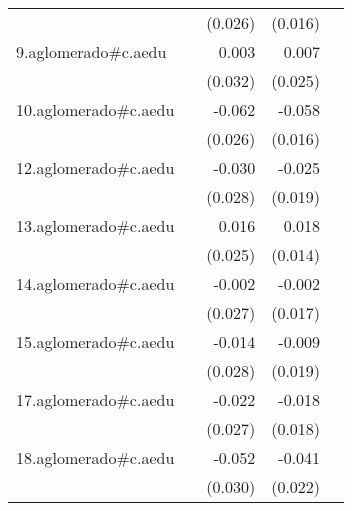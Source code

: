 {\begin{longtable}{l*{4}{D{.}{.}{-1}}}
            &                     &     (0.026)         &     (0.016)         &                     \\
\addlinespace
9.aglomerado#c.aedu&                     &       0.003         &       0.007         &                     \\
            &                     &     (0.032)         &     (0.025)         &                     \\
\addlinespace
10.aglomerado#c.aedu&                     &      -0.062\sym{*}  &      -0.058\sym{***}&                     \\
            &                     &     (0.026)         &     (0.016)         &                     \\
\addlinespace
12.aglomerado#c.aedu&                     &      -0.030         &      -0.025         &                     \\
            &                     &     (0.028)         &     (0.019)         &                     \\
\addlinespace
13.aglomerado#c.aedu&                     &       0.016         &       0.018         &                     \\
            &                     &     (0.025)         &     (0.014)         &                     \\
\addlinespace
14.aglomerado#c.aedu&                     &      -0.002         &      -0.002         &                     \\
            &                     &     (0.027)         &     (0.017)         &                     \\
\addlinespace
15.aglomerado#c.aedu&                     &      -0.014         &      -0.009         &                     \\
            &                     &     (0.028)         &     (0.019)         &                     \\
\addlinespace
17.aglomerado#c.aedu&                     &      -0.022         &      -0.018         &                     \\
            &                     &     (0.027)         &     (0.018)         &                     \\
\addlinespace
18.aglomerado#c.aedu&                     &      -0.052         &      -0.041         &                     \\
            &                     &     (0.030)         &     (0.022)         &                     \\

\end{longtable}}
